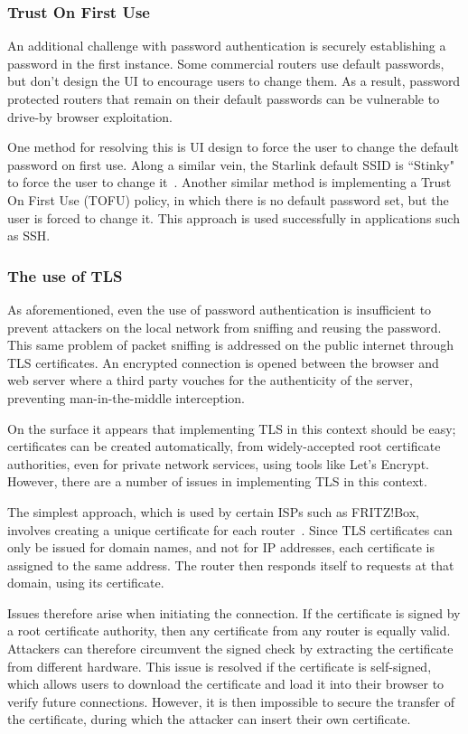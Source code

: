 \subsubsection{Trust On First Use}

An additional challenge with password authentication is securely establishing a password in the first instance.
Some commercial routers use default passwords, but don't design the UI to encourage users to change them.
As a result, password protected routers that remain on their default passwords can be vulnerable to drive-by browser exploitation.

One method for resolving this is UI design to force the user to change the default password on first use.
Along a similar vein, the Starlink default SSID is ``Stinky" to force the user to change it~\cite{stinky_starlink}.
Another similar method is implementing a Trust On First Use (TOFU) policy, in which there is no default password set, but the user is forced to change it.
This approach is used successfully in applications such as SSH.

\subsubsection{The use of TLS}

As aforementioned, even the use of password authentication is insufficient to prevent attackers on the local network from sniffing and reusing the password.
This same problem of packet sniffing is addressed on the public internet through TLS certificates.
An encrypted connection is opened between the browser and web server where a third party vouches for the authenticity of the server, preventing man-in-the-middle interception.

On the surface it appears that implementing TLS in this context should be easy; certificates can be created automatically, from widely-accepted root certificate authorities, even for private network services, using tools like Let's Encrypt.
However, there are a number of issues in implementing TLS in this context.

The simplest approach, which is used by certain ISPs such as FRITZ!Box, involves creating a unique certificate for each router~\cite{fritzbox_cert}.
Since TLS certificates can only be issued for domain names, and not for IP addresses, each certificate is assigned to the same address.
The router then responds itself to requests at that domain, using its certificate.

Issues therefore arise when initiating the connection.
If the certificate is signed by a root certificate authority, then any certificate from any router is equally valid.
Attackers can therefore circumvent the signed check by extracting the certificate from different hardware.
This issue is resolved if the certificate is self-signed, which allows users to download the certificate and load it into their browser to verify future connections.
However, it is then impossible to secure the transfer of the certificate, during which the attacker can insert their own certificate.

